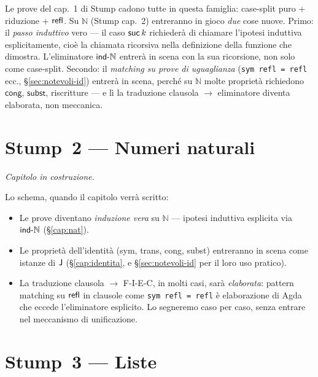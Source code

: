 \bigskip

\begin{oss}
Le prove del cap.~1 di Stump cadono tutte in questa famiglia: case-split puro + riduzione + $\mathsf{refl}$. Su $\mathbb{N}$ (Stump cap.~2) entreranno in gioco \emph{due} cose nuove. Primo: il \emph{passo induttivo} vero --- il caso $\mathsf{suc}\,k$ richieder\`a di chiamare l'ipotesi induttiva esplicitamente, cio\`e la chiamata ricorsiva nella definizione della funzione che dimostra. L'eliminatore $\mathsf{ind\text{-}\mathbb{N}}$ entrer\`a in scena con la sua ricorsione, non solo come case-split. Secondo: il \emph{matching su prove di uguaglianza} (\texttt{sym refl = refl} ecc., \S\ref{sec:notevoli-id}) entrer\`a in scena, perch\'e su $\mathbb{N}$ molte propriet\`a richiedono $\mathsf{cong}$, $\mathsf{subst}$, riscritture --- e l\`i la traduzione clausola $\to$ eliminatore diventa elaborata, non meccanica.
\end{oss}

\chapter{Stump~2 --- Numeri naturali}\label{cap:stump-2}

\noindent\itshape Capitolo in costruzione.\upshape

\bigskip

\noindent Lo schema, quando il capitolo verr\`a scritto:
\begin{itemize}
\item Le prove diventano \emph{induzione vera} su $\mathbb{N}$ --- ipotesi induttiva esplicita via $\mathsf{ind\text{-}\mathbb{N}}$ (\S\ref{cap:nat}).
\item Le propriet\`a dell'identit\`a (sym, trans, cong, subst) entreranno in scena come istanze di $\mathsf{J}$ (\S\ref{cap:identita}, e \S\ref{sec:notevoli-id} per il loro uso pratico).
\item La traduzione clausola $\to$ F-I-E-C, in molti casi, sar\`a \emph{elaborata}: pattern matching su $\mathsf{refl}$ in clausole come \texttt{sym refl = refl} \`e elaborazione di Agda che eccede l'eliminatore esplicito. Lo segneremo caso per caso, senza entrare nel meccanismo di unificazione.
\end{itemize}

\chapter{Stump~3 --- Liste}\label{cap:stump-3}

